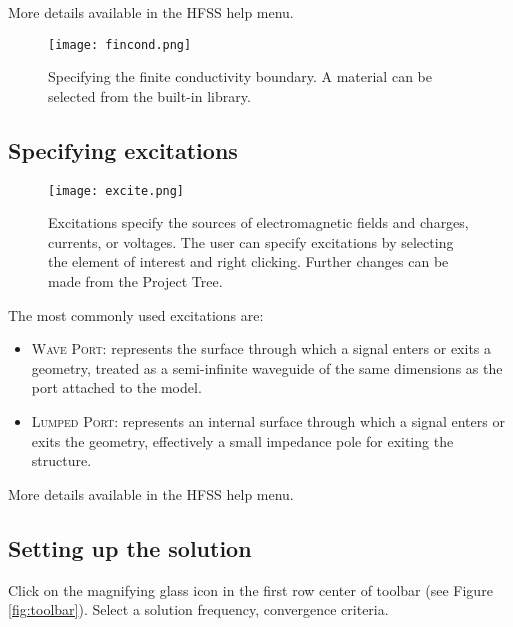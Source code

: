\documentclass[11pt]{article}
\begin{document}
More details available in the HFSS help menu.

\begin{figure}[H]
	\centering
	\texttt{[image: fincond.png]}
	\caption{Specifying the finite conductivity boundary. A material can be selected from the built-in library.}
	\label{fig:fincond}
\end{figure}


\subsection{Specifying excitations}

\begin{figure}[H]
	\centering
	\texttt{[image: excite.png]}
	\caption{Excitations specify the sources of electromagnetic fields and charges, currents, or voltages. The user can specify excitations by selecting the element of interest and right clicking. Further changes can be made from the Project Tree.}
	\label{fig:excite}
\end{figure}

The most commonly used excitations are:
\begin{itemize}

	\item \textsc{Wave Port:} represents the surface through which a signal enters or exits a geometry, treated as a semi-infinite waveguide of the same dimensions as the port attached to the model.

	\item \textsc{Lumped Port:} represents an internal surface through which a signal enters or exits the geometry, effectively a small impedance pole for exiting the structure.

\end{itemize}

More details available in the HFSS help menu.


\subsection{Setting up the solution}

Click on the magnifying glass icon in the first row center of toolbar (see Figure \ref{fig:toolbar}). Select a solution frequency, convergence criteria.
\end{document}
